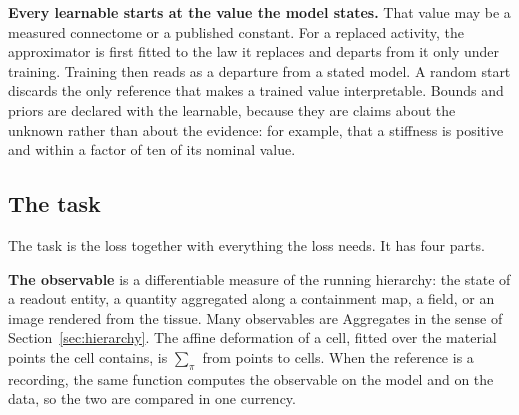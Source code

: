 \documentclass[11pt]{article}
\begin{document}
\textbf{Every learnable starts at the value the model states.} That value may be a
measured connectome or a published constant. For a replaced activity, the approximator is
first fitted to the law it replaces and departs from it only under training. Training
then reads as a departure from a stated model. A random start discards the only reference
that makes a trained value interpretable. Bounds and priors are declared with the
learnable, because they are claims about the unknown rather than about the evidence: for
example, that a stiffness is positive and within a factor of ten of its nominal value.

\subsection{The task}

The task is the loss together with everything the loss needs. It has four parts.

\textbf{The observable} is a differentiable measure of the running hierarchy: the state of
a readout entity, a quantity aggregated along a containment map, a field, or an image
rendered from the tissue. Many observables are Aggregates in the sense of
Section~\ref{sec:hierarchy}. The affine deformation of a cell, fitted over the material
points the cell contains, is $\sum_\pi$ from points to cells. When the reference is a
recording, the same function computes the observable on the model and on the data, so the
two are compared in one currency.
\end{document}
